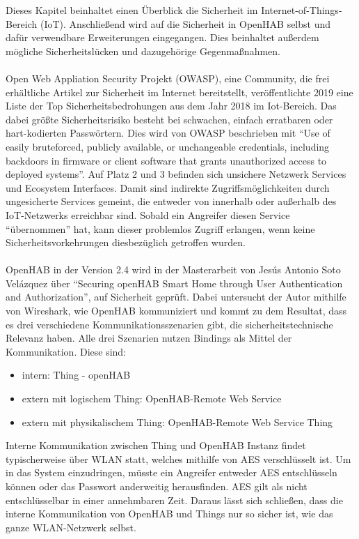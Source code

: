 Dieses Kapitel beinhaltet einen Überblick die Sicherheit im Internet-of-Things-Bereich (IoT).  Anschließend wird auf die Sicherheit in OpenHAB selbst und dafür verwendbare Erweiterungen eingegangen. Dies beinhaltet außerdem mögliche Sicherheitslücken und dazugehörige Gegenmaßnahmen.\\
\\
Open Web Appliation Security Projekt (OWASP), eine Community, die frei erhältliche Artikel zur Sicherheit im Internet bereitstellt, veröffentlichte 2019 eine Liste der Top Sicherheitsbedrohungen aus dem Jahr 2018 im Iot-Bereich.\cite{OWASP01:IOT} Das dabei größte Sicherheitsrisiko besteht bei schwachen, einfach erratbaren oder hart-kodierten Passwörtern. Dies wird von OWASP beschrieben mit "`Use of easily bruteforced, publicly available, or unchangeable credentials, including backdoors in firmware or client software that grants unauthorized access to deployed systems"'.\cite{OWASP01:IOT} Auf Platz 2 und 3 befinden sich unsichere Netzwerk Services und Ecosystem Interfaces. Damit sind indirekte Zugriffsmöglichkeiten durch ungesicherte Services gemeint, die entweder von innerhalb oder außerhalb des IoT-Netzwerks erreichbar sind. Sobald ein Angreifer diesen Service "`übernommen"' hat, kann dieser problemlos Zugriff erlangen, wenn keine Sicherheitsvorkehrungen diesbezüglich getroffen wurden.\\
\\
OpenHAB in der Version 2.4 wird in der Masterarbeit von Jesús Antonio Soto Velázquez über "`Securing openHAB Smart Home through User Authentication and Authorization"', auf Sicherheit geprüft.\cite{MA01:OPH} Dabei untersucht der Autor mithilfe von Wireshark, wie OpenHAB kommuniziert und kommt zu dem Resultat, dass es drei verschiedene Kommunikationsszenarien gibt, die sicherheitstechnische Relevanz haben. Alle drei Szenarien nutzen Bindings als Mittel der Kommunikation. Diese sind:
\begin{itemize}
	\item intern: Thing - openHAB
	\item extern mit logischem Thing: OpenHAB-Remote Web Service
	\item extern mit physikalischem Thing: OpenHAB-Remote Web Service Thing
\end{itemize}	
Interne Kommunikation zwischen Thing und OpenHAB Instanz findet typischerweise über WLAN statt, welches mithilfe von AES verschlüsselt ist. Um in das System einzudringen, müsste ein Angreifer entweder AES entschlüsseln können oder das Passwort anderweitig herausfinden. AES gilt als nicht entschlüsselbar in einer annehmbaren Zeit. Daraus lässt sich schließen, dass die interne Kommunikation von OpenHAB und Things nur so sicher ist, wie das ganze WLAN-Netzwerk selbst.\\
